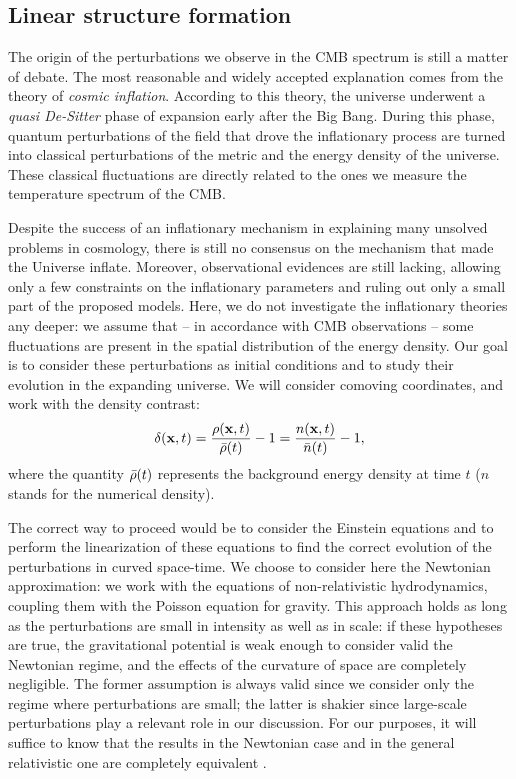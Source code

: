  

 \subsection{Linear structure formation}
 
 The origin of the perturbations we observe in the CMB spectrum is still a matter of debate. The most reasonable and widely accepted explanation comes from the theory of \textit{cosmic inflation}. According to this theory, the universe underwent a \textit{quasi De-Sitter} phase of expansion early after the Big Bang. During this phase, quantum perturbations of the field that drove the inflationary process are turned into classical perturbations of the metric and the energy density of the universe. These classical fluctuations are directly related to the ones we measure the temperature spectrum of the CMB. 
 
 Despite the success of an inflationary mechanism in explaining many unsolved problems in cosmology, there is still no consensus on the mechanism that made the Universe inflate. Moreover, observational evidences are still lacking, allowing only a few constraints on the inflationary parameters and ruling out only a small part of the proposed models. Here, we do not investigate the inflationary theories any deeper: we assume that -- in accordance with CMB observations -- some fluctuations are present in the spatial distribution of the energy density. Our goal is to consider these perturbations as initial conditions and to study their evolution in the expanding universe. We will consider comoving coordinates, and work with the density contrast:
 \begin{equation}
    \delta(\mathbf{x}, t) = \frac{\rho(\mathbf{x},t)}{\Bar{\rho}(t)} -1 = \frac{n(\mathbf{x},t)}{\Bar{n}(t)} -1 ,
 \end{equation}
 where the quantity $\Bar{\rho}(t)$ represents the background energy density at time $t$ ($n$ stands for the numerical density).
 
 The correct way to proceed would be to consider the Einstein equations and to perform the linearization of these equations to find the correct evolution of the perturbations in curved space-time. We choose to consider here the Newtonian approximation: we work with the equations of non-relativistic hydrodynamics, coupling them with the Poisson equation for gravity. This approach holds as long as the perturbations are small in intensity as well as in scale: if these hypotheses are true, the gravitational potential is weak enough to consider valid the Newtonian regime, and the effects of the curvature of space are completely negligible. The former assumption is always valid since we consider only the regime where perturbations are small; the latter is shakier since large-scale perturbations play a relevant role in our discussion. For our purposes, it will suffice to know that the results in the Newtonian case and in the general relativistic one are completely equivalent \citep[for more details, see][]{chisari2011connection}.
 
